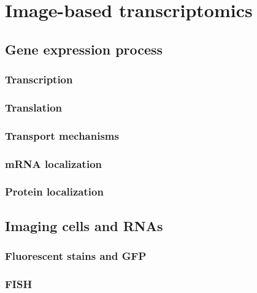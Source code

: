 
\graphicspath{{./figures/introduction/}}

\chapter{Image-based transcriptomics}
\label{ch:introduction}

\minitoc
\newpage

\section{Gene expression process}
\label{sec:gene_expression}

\subsection{Transcription}

\subsection{Translation}

\subsection{Transport mechanisms}

\subsection{\ac{mRNA} localization}


\subsection{Protein localization}

\section{Imaging cells and \ac{RNA}s}
\label{sec:fish}

\subsection{Fluorescent stains and \ac{GFP}}

\subsection{\ac{FISH}}

